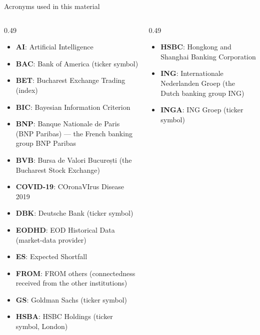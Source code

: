 
{
\begin{frame}[noframenumbering]
    \titlepage
\end{frame}
}
\begin{frame}{Acronyms used in this material}
\begin{columns}[T]
\begin{column}{0.49\textwidth}
\begin{itemize}\setlength{\itemsep}{0pt}
    \item \textbf{AI}: Artificial Intelligence
    \item \textbf{BAC}: Bank of America (ticker symbol)
    \item \textbf{BET}: Bucharest Exchange Trading (index)
    \item \textbf{BIC}: Bayesian Information Criterion
    \item \textbf{BNP}: Banque Nationale de Paris (BNP Paribas) — the French banking group BNP Paribas
    \item \textbf{BVB}: Bursa de Valori București (the Bucharest Stock Exchange)
    \item \textbf{COVID-19}: COronaVIrus Disease 2019
    \item \textbf{DBK}: Deutsche Bank (ticker symbol)
    \item \textbf{EODHD}: EOD Historical Data (market-data provider)
    \item \textbf{ES}: Expected Shortfall
    \item \textbf{FROM}: FROM others (connectedness received from the other institutions)
    \item \textbf{GS}: Goldman Sachs (ticker symbol)
    \item \textbf{HSBA}: HSBC Holdings (ticker symbol, London)
\end{itemize}
\end{column}
\begin{column}{0.49\textwidth}
\begin{itemize}\setlength{\itemsep}{0pt}
    \item \textbf{HSBC}: Hongkong and Shanghai Banking Corporation
    \item \textbf{ING}: Internationale Nederlanden Groep (the Dutch banking group ING)
    \item \textbf{INGA}: ING Groep (ticker symbol)

\end{itemize}
\end{column}
\end{columns}
\end{frame}
